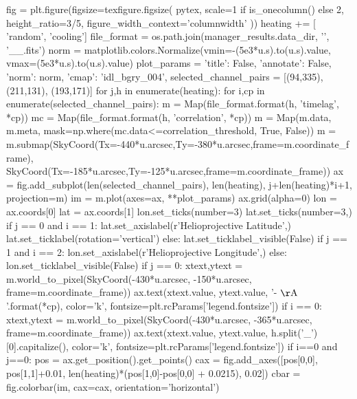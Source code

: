 \begin{pycode}
fig = plt.figure(figsize=texfigure.figsize(
    pytex,
    scale=1 if is_onecolumn() else 2,
    height_ratio=3/5,
    figure_width_context='columnwidth'
))
heating += [ 'random', 'cooling']
file_format = os.path.join(manager_results.data_dir, '{}', '{}_{}_{}.fits')
norm = matplotlib.colors.Normalize(vmin=-(5e3*u.s).to(u.s).value,
                                   vmax=(5e3*u.s).to(u.s).value)
plot_params = {'title': False, 'annotate': False, 'norm': norm, 'cmap': 'idl_bgry_004',}
selected_channel_pairs = [(94,335), (211,131), (193,171)]
for j,h in enumerate(heating):
    for i,cp in enumerate(selected_channel_pairs):
        m = Map(file_format.format(h, 'timelag', *cp))
        mc = Map(file_format.format(h, 'correlation', *cp))
        m = Map(m.data, m.meta, mask=np.where(mc.data<=correlation_threshold, True, False))
        m = m.submap(SkyCoord(Tx=-440*u.arcsec,Ty=-380*u.arcsec,frame=m.coordinate_frame),
                     SkyCoord(Tx=-185*u.arcsec,Ty=-125*u.arcsec,frame=m.coordinate_frame))
        ax = fig.add_subplot(len(selected_channel_pairs), len(heating), j+len(heating)*i+1,
                             projection=m)
        im = m.plot(axes=ax, **plot_params)
        ax.grid(alpha=0)
        lon = ax.coords[0]
        lat = ax.coords[1]
        lon.set_ticks(number=3)
        lat.set_ticks(number=3,) 
        if j == 0 and i == 1:
            lat.set_axislabel(r'Helioprojective Latitude',)
            lat.set_ticklabel(rotation='vertical')
        else:
            lat.set_ticklabel_visible(False)
        if j == 1 and i == 2:
            lon.set_axislabel(r'Helioprojective Longitude',)
        else:
            lon.set_ticklabel_visible(False)
        if j == 0:
            xtext,ytext = m.world_to_pixel(SkyCoord(-430*u.arcsec, -150*u.arcsec, frame=m.coordinate_frame))
            ax.text(xtext.value, ytext.value, '{}-{} $\mathrm{{\AA}}$'.format(*cp),
                    color='k', fontsize=plt.rcParams['legend.fontsize'])
        if i == 0:
            xtext,ytext = m.world_to_pixel(SkyCoord(-430*u.arcsec, -365*u.arcsec, frame=m.coordinate_frame))
            ax.text(xtext.value, ytext.value, h.split('_')[0].capitalize(),
                color='k', fontsize=plt.rcParams['legend.fontsize'])
        if i==0 and j==0:
            pos = ax.get_position().get_points()
            cax = fig.add_axes([pos[0,0], pos[1,1]+0.01, len(heating)*(pos[1,0]-pos[0,0] + 0.0215), 0.02])
            cbar = fig.colorbar(im, cax=cax, orientation='horizontal')

\end{pycode}

